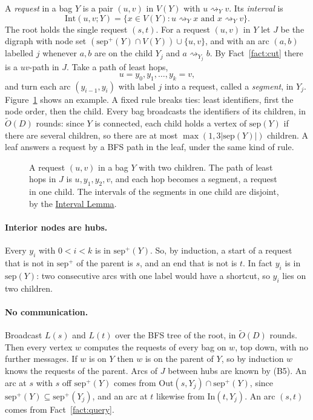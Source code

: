 \documentclass[11pt]{article}
\theoremstyle{definition}
\theoremstyle{remark}
\theoremstyle{plain}
\newcommand{\Ot}{\tilde O}
\newcommand{\sep}{\mathrm{sep}}
\newcommand{\Int}{\mathrm{Int}}
\newcommand{\In}{\mathrm{In}}
\newcommand{\Out}{\mathrm{Out}}
\newcommand{\reach}{\rightsquigarrow}
\begin{document}
A \emph{request} in a bag $Y$ is a pair $(u,v)$ in $V(Y)$ with $u\reach_Y v$. Its \emph{interval} is
\[
\Int(u,v;Y)=\{x\in V(Y): u\reach_Y x\text{ and }x\reach_Y v\}.
\]
The root holds the single request $(s,t)$. For a request $(u,v)$ in $Y$ let $J$ be the digraph with node
set $(\sep^+(Y)\cap V(Y))\cup\{u,v\}$, and with an arc $(a,b)$ labelled $j$ whenever $a,b$ are on the child
$Y_j$ and $a\reach_{Y_j}b$. By Fact~\ref{fact:cut} there is a $uv$-path in $J$. Take a path of least hops,
\[
u=y_0,y_1,\dots,y_k=v,
\]
and turn each arc $(y_{i-1},y_i)$ with label $j$ into a request, called a \emph{segment}, in $Y_j$.
Figure~\ref{fig:requests} shows an example. A fixed rule
breaks ties: least identifiers, first the node order, then the child. Every bag broadcasts the
identifiers of its children, in $\Ot(D)$ rounds: since $Y$ is connected, each child holds a vertex of
$\sep(Y)$ if there are several children, so there are at most $\max(1,3|\sep(Y)|)$ children. A leaf answers a request by a BFS path in the leaf, under the same kind of rule.

\begin{figure}[t]
\centering

\caption{A request $(u,v)$ in a bag $Y$ with two children. The path of least hops in $J$ is $u,y_1,y_2,v$,
and each hop becomes a segment, a request in one child. The intervals of the segments in one child are disjoint, by the \hyperref[lem:A]{Interval Lemma}.}
\label{fig:requests}
\end{figure}

\paragraph{Interior nodes are hubs.} Every $y_i$ with $0<i<k$ is in $\sep^+(Y)$. So, by induction, a start of a request that is
not in $\sep^+$ of the parent is $s$, and an end that is not is $t$. In fact $y_i$ is in $\sep(Y)$: two consecutive
arcs with one label would have a shortcut, so $y_i$ lies on two children.

\paragraph{No communication.} Broadcast $L(s)$ and $L(t)$ over the BFS tree of the root, in $\Ot(D)$ rounds. Then
every vertex $w$ computes the requests of every bag on $w$, top down, with no further messages. If $w$ is on $Y$
then $w$ is on the parent of $Y$, so by induction $w$ knows the requests of the parent. Arcs of $J$ between hubs
are known by (B5). An arc at $s$ with $s$ off $\sep^+(Y)$ comes from $\Out(s,Y_j)\cap\sep^+(Y)$, since
$\sep^+(Y)\subseteq\sep^+(Y_j)$, and an arc at $t$ likewise from $\In(t,Y_j)$. An arc $(s,t)$ comes from
Fact~\ref{fact:query}.
\end{document}
